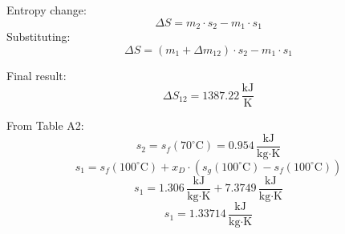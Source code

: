 Entropy change:  
\[
\Delta S = m_2 \cdot s_2 - m_1 \cdot s_1
\]  
Substituting:  
\[
\Delta S = (m_1 + \Delta m_{12}) \cdot s_2 - m_1 \cdot s_1
\]  

Final result:  
\[
\Delta S_{12} = 1387.22 \, \frac{\text{kJ}}{\text{K}}
\]  

From Table A2:  
\[
s_2 = s_f(70^\circ\text{C}) = 0.954 \, \frac{\text{kJ}}{\text{kg·K}}
\]  
\[
s_1 = s_f(100^\circ\text{C}) + x_D \cdot (s_g(100^\circ\text{C}) - s_f(100^\circ\text{C}))
\]  
\[
s_1 = 1.306 \, \frac{\text{kJ}}{\text{kg·K}} + 7.3749 \, \frac{\text{kJ}}{\text{kg·K}}
\]  
\[
s_1 = 1.33714 \, \frac{\text{kJ}}{\text{kg·K}}
\]